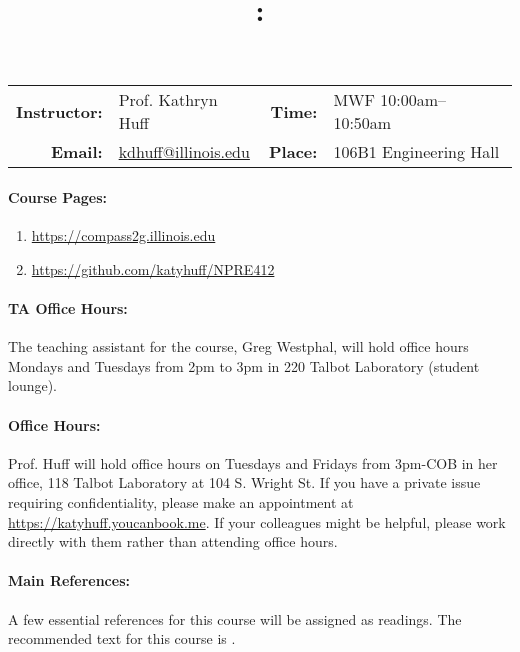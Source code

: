 \documentclass[11pt, a4paper]{article}
\title{\CourseNumber: \CourseTitle\\}
\author{\CourseUniversity}
\date{\CourseSemester \CourseYear}
\makeatletter
\newcommand{\CourseNumber}{NPRE412}
\newcommand{\CourseInstructor}{Prof. Kathryn Huff\xspace}%
\newcommand{\CourseDays}{MWF\xspace}%
\newcommand{\CourseStart}{10:00am\xspace}%
\newcommand{\CourseEnd}{10:50am\xspace}%
\newcommand{\CourseInstructorEmail}{kdhuff@illinois.edu}
\newcommand{\CourseRoom}{106B1\xspace}%
\newcommand{\CourseBuilding}{Engineering Hall\xspace}%
\newcommand{\TeachingAssistant}{Greg Westphal\xspace}%
\newcommand{\TAOfficeHourDays}{Mondays and Tuesdays\xspace}%
\newcommand{\TAOfficeHourStart}{2pm\xspace}%
\newcommand{\TAOfficeHourEnd}{3pm\xspace}%
\newcommand{\TAOfficeHourPlace}{220 Talbot Laboratory (student lounge)\xspace}
\makeatother
\begin{document}
\maketitle
\renewcommand{\arraystretch}{1.5}
\begin{center}
\begin{table}[h]
\begin{tabularx}{\textwidth}{rXrX}
\hline
\textbf{Instructor:} & \CourseInstructor & \textbf{Time:} & \CourseDays \CourseStart -- \CourseEnd \\
\textbf{Email:} &  \href{mailto:\CourseInstructorEmail}{\CourseInstructorEmail} & \textbf{Place:} & \CourseRoom \CourseBuilding\\
\hline
\end{tabularx}
\end{table}
\end{center}

\paragraph{Course Pages:}
\begin{enumerate}
        \item \url{https://compass2g.illinois.edu}
        \item \url{https://github.com/katyhuff/\CourseNumber}
\end{enumerate}

\paragraph{TA Office Hours:} The teaching assistant for the course, 
\TeachingAssistant, will hold office hours \TAOfficeHourDays from 
\TAOfficeHourStart to \TAOfficeHourEnd in \TAOfficeHourPlace.

\paragraph{Office Hours:} Prof. Huff will hold office hours on Tuesdays and 
Fridays from 3pm-COB in her office, 118 Talbot Laboratory at 104 S. Wright St. 
If you have a private issue requiring confidentiality, please make an appointment at 
\url{https://katyhuff.youcanbook.me}. If your colleagues might be helpful, 
please work directly with them rather than attending office hours.

\paragraph{Main References:}
A few essential references for this course will be assigned as readings. The 
recommended text for this course is \cite{tsoulfanidis_nuclear_2013}.

\renewcommand{\refname}{\normalfont\selectfont\normalsize}\vspace{-1cm} 

\end{document}
